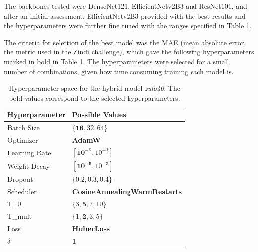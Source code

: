 \documentclass[conference]{IEEEtran}
\begin{document}
The backbones tested were DenseNet121, EfficientNetv2B3 and ResNet101, and after an initial assessment, EfficientNetv2B3 provided with the best results and the hyperparameters were further fine tuned with the ranges specified in Table \ref{parametroszulp}.

The criteria for selection of the best model was the MAE (mean absolute error, the metric used in the Zindi challenge), which gave the following hyperparameters marked in bold in Table \ref{parametroszulp}. The hyperparameters were selected for a small number of combinations, given how time consuming training each model is.


\begin{table}[H]
\centering
\caption{Hyperparameter space for the hybrid model \textit{zulo40}. The bold values correspond to the selected hyperparameters.}
\label{parametroszulp}
\begin{tabular}{ll}
\toprule
\textbf{Hyperparameter} & \textbf{Possible Values} \\
\midrule
Batch Size & $\{\mathbf{16}, 32, 64\}$ \\
Optimizer & \textbf{AdamW} \\
Learning Rate & $[\mathbf{10^{-5}}, 10^{-3}]$ \\
Weight Decay & $[\mathbf{10^{-5}}, 10^{-3}]$ \\
Dropout & $\{0.2, 0.3, \mathbf{0.4}\}$ \\
Scheduler & \textbf{CosineAnnealingWarmRestarts} \\
T\_0 & $\{3, \mathbf{5}, 7, 10\}$ \\
T\_mult & $\{1, \mathbf{2}, 3, 5\}$ \\
Loss & \textbf{HuberLoss} \\
$\delta$ & \textbf{1} \\
\bottomrule
\end{tabular}
\end{table}


\end{document}
